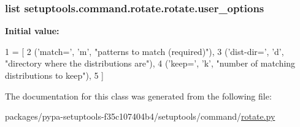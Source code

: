 \subsubsection[{user\+\_\+options}]{\setlength{\rightskip}{0pt plus 5cm}list setuptools.\+command.\+rotate.\+rotate.\+user\+\_\+options\hspace{0.3cm}{\ttfamily [static]}}\label{classsetuptools_1_1command_1_1rotate_1_1rotate_a33329e2d34a8ef0f7ef14c9b1708325b}
{\bfseries Initial value\+:}
\begin{DoxyCode}
1 = [
2         (\textcolor{stringliteral}{'match='}, \textcolor{stringliteral}{'m'}, \textcolor{stringliteral}{"patterns to match (required)"}),
3         (\textcolor{stringliteral}{'dist-dir='}, \textcolor{stringliteral}{'d'}, \textcolor{stringliteral}{"directory where the distributions are"}),
4         (\textcolor{stringliteral}{'keep='}, \textcolor{stringliteral}{'k'}, \textcolor{stringliteral}{"number of matching distributions to keep"}),
5     ]
\end{DoxyCode}


The documentation for this class was generated from the following file\+:\begin{DoxyCompactItemize}
\item 
packages/pypa-\/setuptools-\/f35c107404b4/setuptools/command/\hyperlink{rotate_8py}{rotate.\+py}\end{DoxyCompactItemize}
